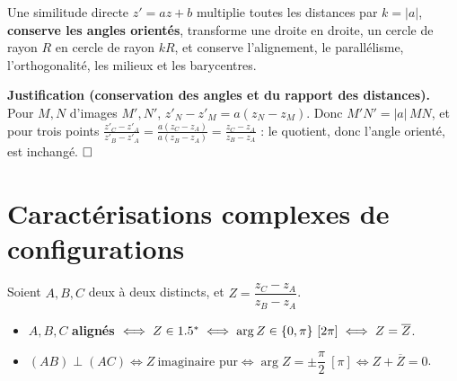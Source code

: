 \begin{propriete}
Une similitude directe $z'=az+b$ multiplie toutes les distances par $k=|a|$, \textbf{conserve les
angles orientés}, transforme une droite en droite, un cercle de rayon $R$ en cercle de rayon $kR$,
et conserve l'alignement, le parallélisme, l'orthogonalité, les milieux et les barycentres.
\end{propriete}

\noindent\textbf{Justification (conservation des angles et du rapport des distances).} Pour
$M,N$ d'images $M',N'$, $z'_N-z'_M=a(z_N-z_M)$. Donc $M'N'=|a|\,MN$, et pour trois points
$\frac{z'_C-z'_A}{z'_B-z'_A}=\frac{a(z_C-z_A)}{a(z_B-z_A)}=\frac{z_C-z_A}{z_B-z_A}$ : le quotient,
donc l'angle orienté, est inchangé. $\hfill\square$

\begin{illus}
\end{illus}

\section{Caractérisations complexes de configurations}

\begin{propriete}
Soient $A,B,C$ deux à deux distincts, et $Z=\dfrac{z_C-z_A}{z_B-z_A}$.
\begin{itemize}
\item $A,B,C$ \textbf{alignés} $\iff Z\in1.5^{*}\iff \arg Z\in\{0,\pi\}\ [2\pi]\iff Z=\overline{Z}$.
\item $(AB)\perp(AC)\iff Z\ \text{imaginaire pur}\iff \arg Z=\pm\dfrac\pi2\ [\pi]\iff Z+\overline Z=0$.
\end{itemize}
\end{propriete}

